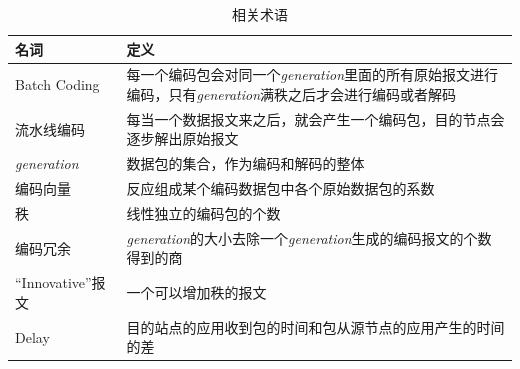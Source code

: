 \begin{table}[htbp]
	\centering
	\caption{相关术语}
	\begin{tabularx}{350pt}{l|X}
		\toprule
		\textbf{名词} & \textbf{定义}\\
		\midrule
		Batch Coding & 每一个编码包会对同一个\emph{generation}里面的所有原始报文进行编码，只有\emph{generation}满秩之后才会进行编码或者解码\\
		\hline
		流水线编码 & 每当一个数据报文来之后，就会产生一个编码包，目的节点会逐步解出原始报文\\
		\hline
		\emph{generation} & 数据包的集合，作为编码和解码的整体\\
		\hline
		编码向量 & 反应组成某个编码数据包中各个原始数据包的系数\\
		\hline
		秩 & 线性独立的编码包的个数\\
		\hline
		编码冗余 & \emph{generation}的大小去除一个\emph{generation}生成的编码报文的个数得到的商\\
		\hline
		“Innovative”报文 & 一个可以增加秩的报文 \\
		\hline
		Delay & 目的站点的应用收到包的时间和包从源节点的应用产生的时间的差\\
		\bottomrule
	\end{tabularx}

\label{SHUYU}
\end{table}
